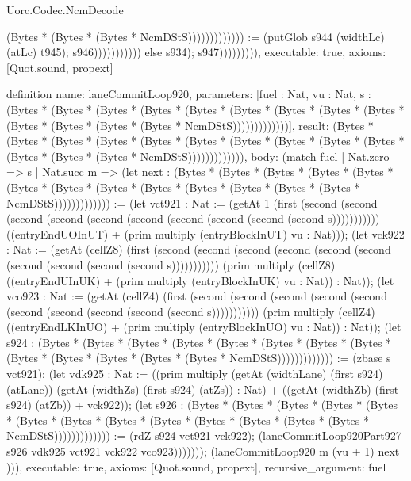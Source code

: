 \begin{lexlean}{Uorc.Codec.NcmDecode}
\begin{semanticmodule}
{(Bytes * (Bytes * (Bytes * NcmDStS))))))))))))) := (putGlob s944 (widthLc) (atLc) t945); s946))))))))))) else s934); s947))))))))),
  executable: true,
  axioms: [Quot.sound, propext]
}

definition{
  name: laneCommitLoop920,
  parameters: [fuel : Nat, vu : Nat, s : (Bytes * (Bytes * (Bytes * (Bytes * (Bytes * (Bytes * (Bytes * (Bytes * (Bytes * (Bytes * (Bytes * (Bytes * (Bytes * NcmDStS)))))))))))))],
  result: (Bytes * (Bytes * (Bytes * (Bytes * (Bytes * (Bytes * (Bytes * (Bytes * (Bytes * (Bytes * (Bytes * (Bytes * (Bytes * NcmDStS))))))))))))),
  body: (match fuel
    | Nat.zero => s
    | Nat.succ m => (let next : (Bytes * (Bytes * (Bytes * (Bytes * (Bytes * (Bytes * (Bytes * (Bytes * (Bytes * (Bytes * (Bytes * (Bytes * (Bytes * NcmDStS))))))))))))) := (let vct921 : Nat := (getAt 1 (first (second (second (second (second (second (second (second (second (second (second s))))))))))) ((entryEndUOInUT) + (prim multiply (entryBlockInUT) vu : Nat))); (let vck922 : Nat := (getAt (cellZ8) (first (second (second (second (second (second (second (second (second (second (second s))))))))))) (prim multiply (cellZ8) ((entryEndUInUK) + (prim multiply (entryBlockInUK) vu : Nat)) : Nat)); (let vco923 : Nat := (getAt (cellZ4) (first (second (second (second (second (second (second (second (second (second (second s))))))))))) (prim multiply (cellZ4) ((entryEndLKInUO) + (prim multiply (entryBlockInUO) vu : Nat)) : Nat)); (let s924 : (Bytes * (Bytes * (Bytes * (Bytes * (Bytes * (Bytes * (Bytes * (Bytes * (Bytes * (Bytes * (Bytes * (Bytes * (Bytes * NcmDStS))))))))))))) := (zbase s vct921); (let vdk925 : Nat := ((prim multiply (getAt (widthLane) (first s924) (atLane)) (getAt (widthZs) (first s924) (atZs)) : Nat) + ((getAt (widthZb) (first s924) (atZb)) + vck922)); (let s926 : (Bytes * (Bytes * (Bytes * (Bytes * (Bytes * (Bytes * (Bytes * (Bytes * (Bytes * (Bytes * (Bytes * (Bytes * (Bytes * NcmDStS))))))))))))) := (rdZ s924 vct921 vck922); (laneCommitLoop920Part927 s926 vdk925 vct921 vck922 vco923))))))); (laneCommitLoop920 m (vu + 1) next ))),
  executable: true,
  axioms: [Quot.sound, propext],
  recursive_argument: fuel
}


\end{semanticmodule}
\end{lexlean}
